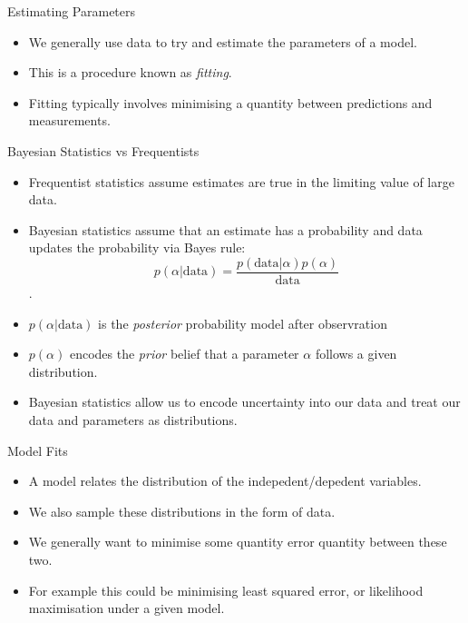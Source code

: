 \documentclass[
  ignorenonframetext,
]{beamer}
\begin{document}
\begin{frame}{Estimating Parameters}
\protect\hypertarget{estimating-parameters}{}
\begin{itemize}
\item
  We generally use data to try and estimate the parameters of a model.
\item
  This is a procedure known as \emph{fitting}.
\item
  Fitting typically involves minimising a quantity between predictions
  and measurements.
\end{itemize}
\end{frame}

\begin{frame}{Bayesian Statistics vs Frequentists}
\protect\hypertarget{bayesian-statistics-vs-frequentists}{}
\begin{itemize}
\item
  Frequentist statistics assume estimates are true in the limiting value
  of large data.
\item
  Bayesian statistics assume that an estimate has a probability and data
  updates the probability via Bayes rule:
  \[p(\alpha | \text{data}) =\frac{ p( \text{data} | \alpha) p(\alpha) }{\text{data}}\].
\item
  \(p(\alpha | \text{data})\) is the \emph{posterior} probability model
  after observration
\item
  \(p(\alpha)\) encodes the \emph{prior} belief that a parameter
  \(\alpha\) follows a given distribution.
\item
  Bayesian statistics allow us to encode uncertainty into our data and
  treat our data and parameters as distributions.
\end{itemize}
\end{frame}

\begin{frame}{Model Fits}
\protect\hypertarget{model-fits}{}
\begin{itemize}
\item
  A model relates the distribution of the indepedent/depedent variables.
\item
  We also sample these distributions in the form of data.
\item
  We generally want to minimise some quantity error quantity between
  these two.
\item
  For example this could be minimising least squared error, or
  likelihood maximisation under a given model.
\end{itemize}
\end{frame}
\end{document}
